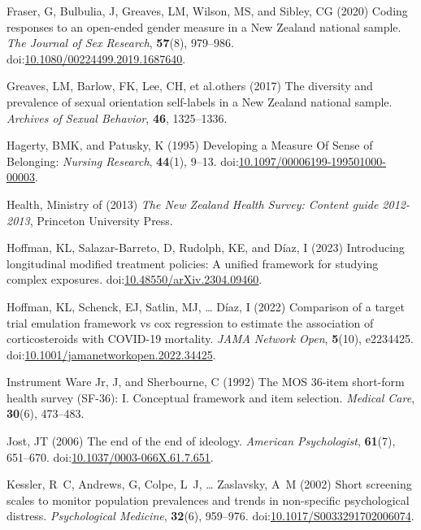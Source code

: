 \documentclass[
  single column]{article}
\newlength{\cslhangindent}
\newenvironment{CSLReferences}[2] %
 {\begin{list}{}{%
  \setlength{\itemindent}{0pt}
  \setlength{\leftmargin}{0pt}
  \setlength{\parsep}{0pt}
  \ifodd #1
   \setlength{\leftmargin}{\cslhangindent}
   \setlength{\itemindent}{-1\cslhangindent}
  \fi
  \setlength{\itemsep}{#2\baselineskip}}}
 {\end{list}}
\begin{document}
\begin{CSLReferences}{1}{0}
Fraser, G, Bulbulia, J, Greaves, LM, Wilson, MS, and Sibley, CG (2020)
Coding responses to an open-ended gender measure in a {N}ew {Z}ealand
national sample. \emph{The Journal of Sex Research}, \textbf{57}(8),
979--986.
doi:\href{https://doi.org/10.1080/00224499.2019.1687640}{10.1080/00224499.2019.1687640}.

Greaves, LM, Barlow, FK, Lee, CH, et al.others (2017) The diversity and
prevalence of sexual orientation self-labels in a {N}ew {Z}ealand
national sample. \emph{Archives of Sexual Behavior}, \textbf{46},
1325--1336.

Hagerty, BMK, and Patusky, K (1995) Developing a Measure Of Sense of
Belonging: \emph{Nursing Research}, \textbf{44}(1), 9--13.
doi:\href{https://doi.org/10.1097/00006199-199501000-00003}{10.1097/00006199-199501000-00003}.

Health, Ministry of (2013) \emph{The {N}ew {Z}ealand {H}ealth {S}urvey:
Content guide 2012-2013}, Princeton University Press.

Hoffman, KL, Salazar-Barreto, D, Rudolph, KE, and Díaz, I (2023)
Introducing longitudinal modified treatment policies: A unified
framework for studying complex exposures.
doi:\href{https://doi.org/10.48550/arXiv.2304.09460}{10.48550/arXiv.2304.09460}.

Hoffman, KL, Schenck, EJ, Satlin, MJ, \ldots{} Díaz, I (2022) Comparison
of a target trial emulation framework vs cox regression to estimate the
association of corticosteroids with COVID-19 mortality. \emph{JAMA
Network Open}, \textbf{5}(10), e2234425.
doi:\href{https://doi.org/10.1001/jamanetworkopen.2022.34425}{10.1001/jamanetworkopen.2022.34425}.

Instrument Ware Jr, J, and Sherbourne, C (1992) The MOS 36-item
short-form health survey (SF-36): I. Conceptual framework and item
selection. \emph{Medical Care}, \textbf{30}(6), 473--483.

Jost, JT (2006) The end of the end of ideology. \emph{American
Psychologist}, \textbf{61}(7), 651--670.
doi:\href{https://doi.org/10.1037/0003-066X.61.7.651}{10.1037/0003-066X.61.7.651}.

Kessler, R~C, Andrews, G, Colpe, L~J, \ldots{} Zaslavsky, A~M (2002)
Short screening scales to monitor population prevalences and trends in
non-specific psychological distress. \emph{Psychological Medicine},
\textbf{32}(6), 959--976.
doi:\href{https://doi.org/10.1017/S0033291702006074}{10.1017/S0033291702006074}.


\end{CSLReferences}
\end{document}
